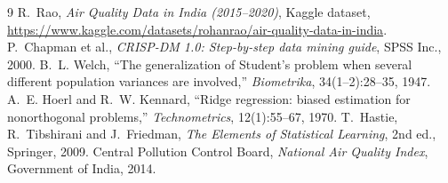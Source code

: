\documentclass[11pt,a4paper]{article}
\begin{document}
\begin{thebibliography}{9}
 R.~Rao, \emph{Air Quality Data in India (2015--2020)}, Kaggle dataset, \url{https://www.kaggle.com/datasets/rohanrao/air-quality-data-in-india}.
 P.~Chapman et al., \emph{CRISP-DM 1.0: Step-by-step data mining guide}, SPSS Inc., 2000.
 B.~L. Welch, ``The generalization of Student's problem when several different population variances are involved,'' \emph{Biometrika}, 34(1--2):28--35, 1947.
 A.~E. Hoerl and R.~W. Kennard, ``Ridge regression: biased estimation for nonorthogonal problems,'' \emph{Technometrics}, 12(1):55--67, 1970.
 T.~Hastie, R.~Tibshirani and J.~Friedman, \emph{The Elements of Statistical Learning}, 2nd ed., Springer, 2009.
 Central Pollution Control Board, \emph{National Air Quality Index}, Government of India, 2014.
\end{thebibliography}
\end{document}
